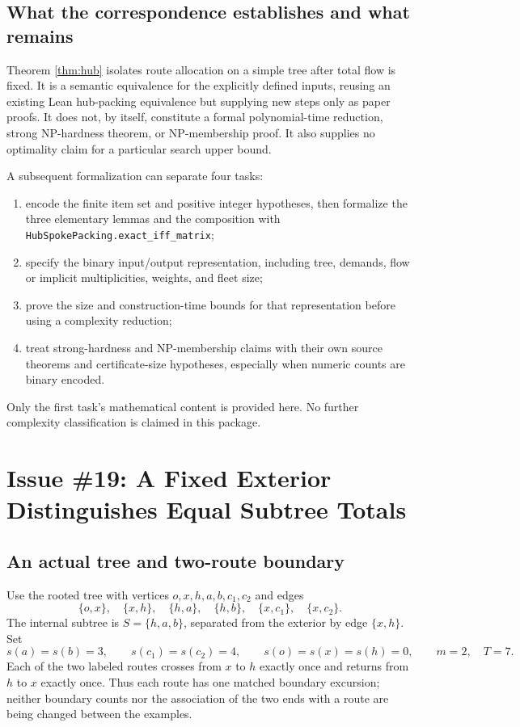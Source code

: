 \documentclass[11pt]{article}
\theoremstyle{remark}
\newcommand{\code}[1]{\nolinkurl{#1}}
\begin{document}
\subsection{What the correspondence establishes and what remains}

Theorem \ref{thm:hub} isolates route allocation on a simple tree after total flow is fixed.
It is a semantic equivalence for the explicitly defined inputs, reusing an existing Lean hub-packing equivalence but supplying new steps only as paper proofs.
It does not, by itself, constitute a formal polynomial-time reduction, strong NP-hardness theorem, or NP-membership proof.
It also supplies no optimality claim for a particular search upper bound.

A subsequent formalization can separate four tasks:
\begin{enumerate}
 \item encode the finite item set and positive integer hypotheses, then formalize the three elementary lemmas and the composition with \code{HubSpokePacking.exact_iff_matrix};
 \item specify the binary input/output representation, including tree, demands, flow or implicit multiplicities, weights, and fleet size;
 \item prove the size and construction-time bounds for that representation before using a complexity reduction;
 \item treat strong-hardness and NP-membership claims with their own source theorems and certificate-size hypotheses, especially when numeric counts are binary encoded.
\end{enumerate}
Only the first task's mathematical content is provided here. No further complexity classification is claimed in this package.

\section{Issue \#19: A Fixed Exterior Distinguishes Equal Subtree Totals}

\subsection{An actual tree and two-route boundary}

Use the rooted tree with vertices $o,x,h,a,b,c_1,c_2$ and edges
\[
 \{o,x\},\quad\{x,h\},\quad\{h,a\},\quad\{h,b\},\quad
 \{x,c_1\},\quad\{x,c_2\}.
\]
The internal subtree is $S=\{h,a,b\}$, separated from the exterior by edge $\{x,h\}$.
Set
\[
 s(a)=s(b)=3,\qquad s(c_1)=s(c_2)=4,\qquad
 s(o)=s(x)=s(h)=0,\qquad m=2,\quad T=7.
\]
Each of the two labeled routes crosses from $x$ to $h$ exactly once and returns from $h$ to $x$ exactly once.
Thus each route has one matched boundary excursion; neither boundary counts nor the association of the two ends with a route are being changed between the examples.
\end{document}
